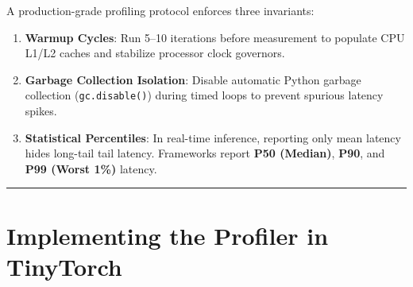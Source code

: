 \documentclass[
  letterpaper,
]{scrbook}
\providecommand{\tightlist}{%
  \setlength{\itemsep}{0pt}\setlength{\parskip}{0pt}}
\begin{document}
A production-grade profiling protocol enforces three invariants:

\begin{enumerate}
\def\labelenumi{\arabic{enumi}.}
\tightlist
\item
  \textbf{Warmup Cycles}: Run 5--10 iterations before measurement to
  populate CPU L1/L2 caches and stabilize processor clock governors.
\item
  \textbf{Garbage Collection Isolation}: Disable automatic Python
  garbage collection (\texttt{gc.disable()}) during timed loops to
  prevent spurious latency spikes.
\item
  \textbf{Statistical Percentiles}: In real-time inference, reporting
  only mean latency hides long-tail tail latency. Frameworks report
  \textbf{P50 (Median)}, \textbf{P90}, and \textbf{P99 (Worst 1\%)}
  latency.
\end{enumerate}

\begin{center}\rule{0.5\linewidth}{0.5pt}\end{center}

\section{Implementing the Profiler in
TinyTorch}\label{implementing-the-profiler-in-tinytorch}
\end{document}
